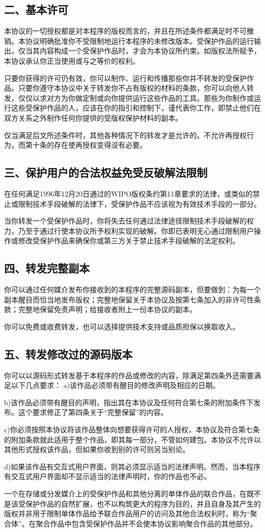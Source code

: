 \subsection{二、基本许可}
本协议的一切授权都是对本程序的版权而言的，并且在所述条件都满足时不可撤销。本协议明确批准你不受限制地运行本程序的未修改版本。受保护作品的运行输出，仅当其内容构成一个受保护作品时，才会为本协议所约束。如版权法所赋予，本协议承认你正当使用或与之等价的权利。\par
只要你获得的许可仍有效，你可以制作、运行和传播那些你并不转发的受保护作品。只要你遵守本协议中关于转发你不占有版权的材料的条款，你可以向他人转发，仅仅以求对方为你做定制或向你提供运行这些作品的工具。那些为你制作或运行这些受保护作品的人，应该在你的指引和控制下，谨代表你工作，即禁止他们在双方关系之外制作任何你提供的受版权保护材料的副本。\par
仅当满足后文所述条件时，其他各种情况下的转发才是允许的。不允许再授权行为，而第十条的存在使再授权变得没有必要。
\subsection{三、保护用户的合法权益免受反破解法限制}
在任何满足1996年12月20日通过的WIPO版权条约第11章要求的法律，或类似的禁止或限制技术手段破解的法律下，受保护作品不应该视为有效技术手段的一部分。\par
当你转发一个受保护作品时，你将失去任何通过法律途径限制技术手段破解的权力，乃至于通过行使本协议所予权利实现的破解。你即已表明无心通过限制用户操作或修改受保护作品来确保你或第三方关于禁止技术手段破解的法定权利。
\subsection{四、转发完整副本}
你可以通过任何媒介发布你接收到的本程序的完整源码副本，但要做到：为每一个副本醒目而恰当地发布版权；完整地保留关于本协议及按第七条加入的非许可性条款；完整地保留免责声明；给接收者附上一份本协议的副本。\par
你可以免费或收费转发，也可以选择提供技术支持或品质担保以换取收入。
\subsection{五、转发修改过的源码版本}
你可以以源码形式转发基于本程序的作品或修改的内容，除满足第四条外还需要满足以下几点要求：
a)该作品必须带有醒目的修改声明及相应的日期。\par
b)该作品必须带有醒目的声明，指出其在本协议及任何符合第七条的附加条件下发布。这个要求修正了第四条关于“完整保留”的内容。\par
c)你必须按照本协议将该作品整体向想要获得许可的人授权，本协议及符合第七条的附加条款就此适用于整个作品，即其每一部分，不管如何建包。本协议不允许以其他形式授权该作品，但如果你收到别的许可则另当别论。\par
d)如果该作品有交互式用户界面，则其必须显示适当的法律声明。然而，当本程序有交互式用户界面却不显示适当的法律声明时，你的作品也不必。\par
一个在存储或分发媒介上的受保护作品和其他分离的单体作品的联合作品，在既不是该受保护作品的自然扩展，也不以构筑更大的程序为目的，并且自身及其产生的版权并非用于限制单体作品给予联合作品用户的访问及其他合法权利时，称为“聚合体”。在聚合作品中包含受保护作品并不会使本协议影响聚合作品的其他部分。
